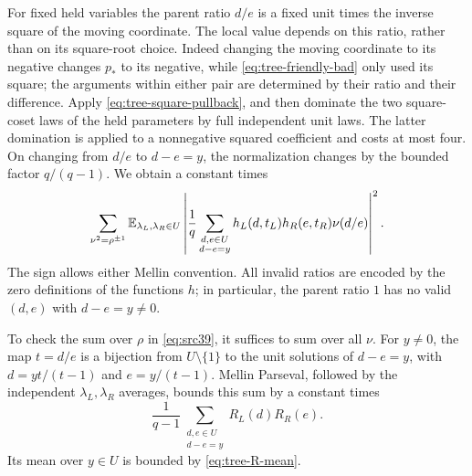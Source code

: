 For fixed held variables the parent ratio $d/e$ is a fixed unit times
the inverse square of the moving coordinate.  The local value depends
on this ratio, rather than on its square-root choice.  Indeed changing
the moving coordinate to its negative changes $p_*$ to its negative,
while \eqref{eq:tree-friendly-bad} only used its square; the arguments
within either pair are determined by their ratio and their difference.
Apply \eqref{eq:tree-square-pullback}, and then dominate the two
square-coset laws of the held parameters by full independent unit laws.
The latter domination is applied to a nonnegative squared coefficient
and costs at most four.  On changing from $d/e$ to $d-e=y$, the
normalization changes by the bounded factor $q/(q-1)$.  We obtain a
constant times
\begin{equation}\label{eq:src41}
 \sum_{\nu^2=\rho^{\pm1}}
 \mathbb E_{\lambda_L,\lambda_R\in U}
 \left|\frac1q\sum_{\substack{d,e\in U\\d-e=y}}
 h_L(d,t_L)h_R(e,t_R)\nu(d/e)\right|^2.
\end{equation}
The sign allows either Mellin convention.  All invalid ratios are
encoded by the zero definitions of the functions $h$; in particular,
the parent ratio $1$ has no valid $(d,e)$ with $d-e=y\ne0$.

To check the sum over $\rho$ in \eqref{eq:src39}, it suffices to sum
over all $\nu$.  For $y\ne0$, the map $t=d/e$ is a bijection from
$U\setminus\{1\}$ to the unit solutions of $d-e=y$, with
$d=yt/(t-1)$ and $e=y/(t-1)$.  Mellin Parseval, followed by the
independent $\lambda_L,\lambda_R$ averages, bounds this sum by a
constant times
\[
 \frac1{q-1}\sum_{\substack{d,e\in U\\d-e=y}}R_L(d)R_R(e).
\]
Its mean over $y\in U$ is bounded by \eqref{eq:tree-R-mean}.

